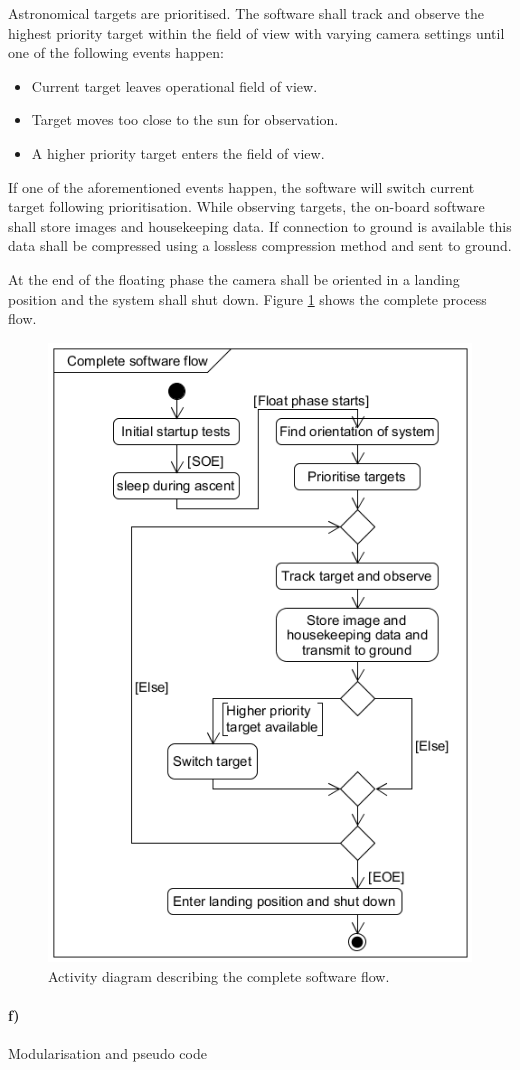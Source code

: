 Astronomical targets are prioritised. The software shall track and observe the highest priority target within the field of view with varying camera settings until one of the following events happen:

\begin{itemize}
	\item Current target leaves operational field of view.
	\item Target moves too close to the sun for observation.
	\item A higher priority target enters the field of view.
\end{itemize}

If one of the aforementioned events happen, the software will switch current target following prioritisation. While observing targets, the on-board software shall store images and housekeeping data. If connection to ground is available this data shall be compressed using a lossless compression method and sent to ground.

At the end of the floating phase the camera shall be oriented in a landing position and the system shall shut down. Figure \ref{fig:software-activity-diagram} shows the complete process flow.

\begin{figure}[H]
    \centering
    \includegraphics[width=.5\textwidth]{4-experiment-design/img/software/activity-diagram.png}
    \caption{Activity diagram describing the complete software flow.}
    \label{fig:software-activity-diagram}
\end{figure}


\paragraph{f)} Modularisation and pseudo code\\

